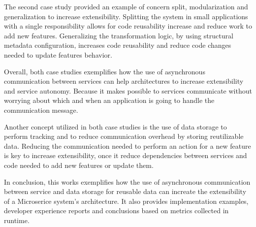 The second case study provided an example of concern split, modularization and generalization to increase extensibility. Splitting the system in small applications with a single responsibility allows for code reusability increase and reduce work to add new features. Generalizing the transformation logic, by using structural metadata configuration, increases code reusability and reduce code changes needed to update features behavior.

Overall, both case studies exemplifies how the use of asynchronous communication between services can help architectures to increase extensibility and service autonomy. Because it makes possible to services communicate without worrying about which and when an application is going to handle the communication message.

Another concept utilized in both case studies is the use of data storage to perform tracking and to reduce communication overhead by storing reutilizable data. Reducing the communication needed to perform an action for a new feature is key to increase extensibility, once it reduce dependencies between services and code needed to add new features or update them.

In conclusion, this works exemplifies how the use of asynchronous communication between service and data storage for reusable data can increate the extensibility of a Microserice system's architecture. It also provides implementation examples, developer experience reports and conclusions based on metrics collected in runtime.
